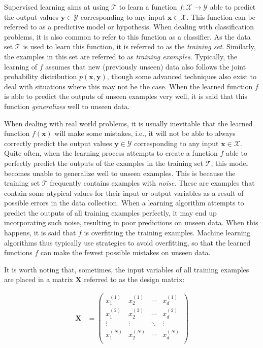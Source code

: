 Supervised learning aims at using $\mathcal{T}$ to learn a function $f: \mathcal{X} \rightarrow \mathcal{Y}$ able to predict the output values $\mathbf{y} \in \mathcal{Y}$ corresponding to any input $\mathbf{x} \in \mathcal{X}$. 
This function can be referred to as a  predictive model or hypothesis. When dealing with classification problems, it is also common to refer to this function as a classifier.
As the data set $\mathcal{T}$ is used to learn this function, it is referred to as the \textit{training set}. Similarly, the examples in this set are referred to as \textit{training examples}. Typically, the learning of $f$ assumes that new (previously unseen) data also follows the joint probability distribution $p(\mathbf{x},\mathbf{y})$, though some advanced techniques also exist to deal with situations where this may not be the case. When the learned function $f$ is able to predict the outputs of unseen examples very well, it is said that this function \textit{generalizes} well to unseen data. 

When dealing with real world problems, it is usually inevitable that the learned function $f(\mathbf{x})$ will make some mistakes, i.e., it will not be able to always correctly predict the output values  $\mathbf{y} \in \mathcal{Y}$ corresponding to any input $\mathbf{x} \in \mathcal{X}$. Quite often, when the learning process attempts to create a function $f$ able to perfectly predict the outputs of the examples in the training set $\mathcal{T}$, this model becomes unable to generalize well to unseen examples. This is because the training set $\mathcal{T}$ frequently contains examples with \textit{noise}. These are examples that contain some atypical values for their input or output variables as a result of possible errors in the data collection. When a learning algorithm attempts to predict the outputs of all training examples perfectly, it may end up incorporating such noise, resulting in poor predictions on unseen data. When this happens, it is said that $f$ is overfitting the training examples. Machine learning algorithms thus typically use strategies to avoid overfitting, so that the learned functions $f$ can make the fewest possible mistakes on unseen data.  

It is worth noting that, sometimes, the input variables of all training examples are placed in a matrix $\mathbf{X}$ referred to as the design matrix:

\begin{align}
    \mathbf{X} &= \begin{pmatrix}
           x^{(1)}_{1} & x^{(1)}_{2} & \cdots & x^{(1)}_{d} \\
           x^{(2)}_{1} & x^{(2)}_{2} & \cdots & x^{(2)}_{d} \\
           \vdots & \vdots & \ddots & \vdots \\
		   x^{(N)}_{1} & x^{(N)}_{2} & \cdots & x^{(N)}_{d} \\
         \end{pmatrix}
  \end{align}

